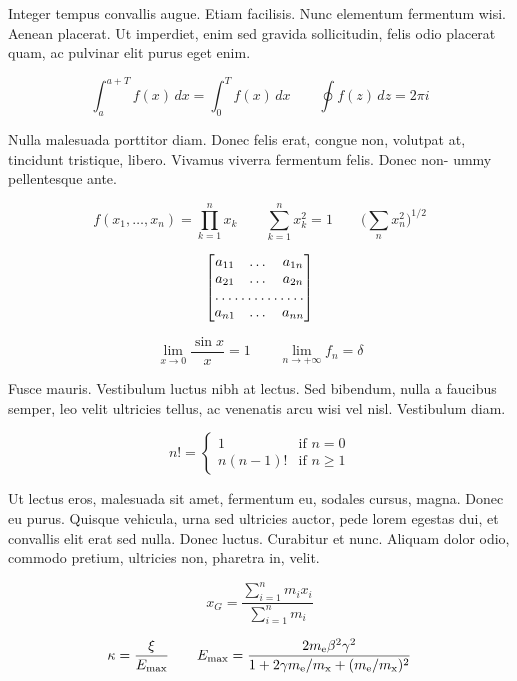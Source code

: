 Integer tempus convallis augue. Etiam facilisis. Nunc elementum fermentum wisi. Aenean placerat. Ut imperdiet, enim sed gravida sollicitudin, felis odio placerat quam, ac pulvinar elit purus eget enim.

\begin{equation}
\int_a^{a+T}f(x)\,dx= \int_0^T f(x)\,dx
\qquad
\oint f(z)\,dz=2\pi i
\end{equation}

Nulla malesuada porttitor diam. Donec felis erat, congue non, volutpat at, tincidunt tristique, libero. Vivamus viverra fermentum felis. Donec non- ummy pellentesque ante.

\begin{equation}
f(x_1,\dots,x_n)=  \prod_{k=1}^n x_k
\qquad
\sum_{k=1}^n x_k^2=1
\qquad
\biggl(\sum_n x_n^2\biggr)^{1/2}
\end{equation}

\lipsum[2]

\begin{equation}
\begin{bmatrix}
a_{11} & \dots & a_{1n} \\
a_{21} & \dots & a_{2n} \\
\hdotsfor{3} \\
a_{n1} & \dots & a_{nn}
\end{bmatrix}
\end{equation}

\lipsum[4]

\begin{equation}
\lim_{x\to 0}
\frac{\sin x}{x}=1 \qquad
\lim_{n\to +\infty}f_n=\delta
\end{equation}

Fusce mauris. Vestibulum luctus nibh at lectus. Sed bibendum, nulla a faucibus semper, leo velit ultricies tellus, ac venenatis arcu wisi vel nisl. Vestibulum diam.

\begin{equation}
n!=
\begin{cases}
1       & \text{if $n=0$} \\
n(n-1)! & \text{if $n\ge 1$}
\end{cases}
\end{equation}

Ut lectus eros, malesuada sit amet, fermentum eu, sodales cursus, magna. Donec eu purus. Quisque vehicula, urna sed ultricies auctor, pede lorem egestas dui, et convallis elit erat sed nulla. Donec luctus. Curabitur et nunc. Aliquam dolor odio, commodo pretium, ultricies non, pharetra in, velit.

\begin{equation}
x_G=
\frac{\displaystyle
      \sum_{i=1}^n m_ix_i}
{\displaystyle\sum_{i=1}^n m_i}
\end{equation}

\lipsum[6]

\begin{equation}
\kappa =\frac{\xi}{E_{\textrm{max}}}
\qquad
E_{\textup{max}} =\frac{2 m_{\textup{e}} \beta^2\gamma^2 }{1 +2\gamma m_{\textup{e}}/m_{\textrm{x}} + ( m_{\textup{e}}/m_{\textup{x}})^2}
\end{equation}

\lipsum[8]
